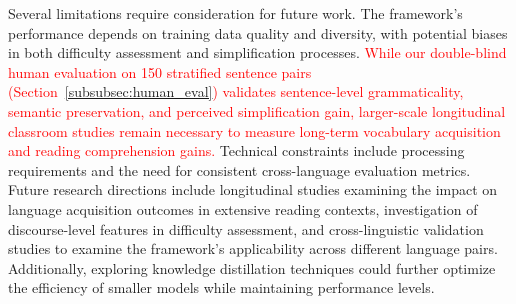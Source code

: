 Several limitations require consideration for future work. The framework's performance depends on training data quality and diversity, with potential biases in both difficulty assessment and simplification processes. \textcolor{red}{While our double-blind human evaluation on 150 stratified sentence pairs (Section~\ref{subsubsec:human_eval}) validates sentence-level grammaticality, semantic preservation, and perceived simplification gain, larger-scale longitudinal classroom studies remain necessary to measure long-term vocabulary acquisition and reading comprehension gains.} Technical constraints include processing requirements and the need for consistent cross-language evaluation metrics. Future research directions include longitudinal studies examining the impact on language acquisition outcomes in extensive reading contexts, investigation of discourse-level features in difficulty assessment, and cross-linguistic validation studies to examine the framework's applicability across different language pairs. Additionally, exploring knowledge distillation techniques could further optimize the efficiency of smaller models while maintaining performance levels.